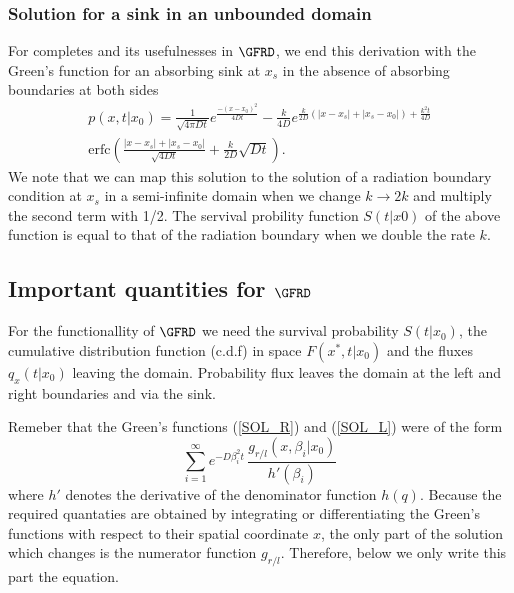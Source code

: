 \subsubsection{Solution for a sink in an unbounded domain}

For completes and its usefulnesses in $\GFRD$, we end this derivation with the Green's function for an absorbing sink at $x_s$ in the absence of absorbing boundaries at both sides
\begin{multline}
 p(x,t|x_0) = \frac{1}{\sqrt{4 \pi D t}}e^{\frac{-(x-x_0)^2}{4 D t}} - \frac{k}{4 D}e^{\frac{k}{2 D}(|x-x_s|+|x_s-x_0|)+\frac{k^2 t}{4 D}} \\
\mathrm{erfc}\left( \frac{|x-x_s|+|x_s-x_0|}{\sqrt{4 D t}}+\frac{k}{2D}\sqrt{D t} \right).
\label{FSOL_NB}
\end{multline}
We note that we can map this solution to the solution of a radiation boundary condition at $x_s$ in a semi-infinite domain when we change $k \rightarrow 2 k$ and multiply the second term with 1/2. The servival probility function $S(t|x0)$ of the above function is equal to that of the radiation boundary when we double the rate $k$.

\subsection{Important quantities for $\GFRD$}

For the functionallity of $\GFRD$ we need the survival probability $S(t|x_0)$, the cumulative distribution function (c.d.f) in space $F(x^*,t|x_0)$ and the fluxes $q_x(t|x_0)$ leaving the domain. Probability flux leaves the domain at the left and right boundaries and via the sink.

Remeber that the Green's functions (\ref{SOL_R}) and (\ref{SOL_L}) were of the form
\begin{equation} 
 \sum_{i=1}^{\infty} e^{-D \beta_i ^2 t} \, \frac{g_{r/l}(x, \beta_i |x_0)}{ h'(\beta_i)}
\end{equation}
where $h'$ denotes the derivative of the denominator function $h(q)$. Because the required quantaties are obtained by integrating or differentiating the Green's functions with respect to their spatial coordinate $x$, the only part of the solution which changes is the numerator function $g_{r/l}$. Therefore, below we only write this part the equation.

